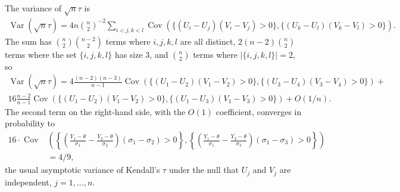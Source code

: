 \documentclass[12pt]{article}
\renewcommand{\P}{P}
\newcommand{\y}{Y}
\renewcommand{\u}{U}
\renewcommand{\v}{V}
\newcommand{\thetahat}{\hat{\theta}}
\newcommand{\h}[2]{\{(\u_{#1}-\u_{#2})(\v_{#1}-\v_{#2})>0\}}
\DeclareMathOperator{\E}{E}
\DeclareMathOperator{\V}{Var}
\DeclareMathOperator{\Cov}{Cov}
\newcommand{\comment}[1]{
  \iftoggle{commenttoggle}{
    {\normalsize{\color{red}{ #1}}\normalsize}
  }
  {}
}
\begin{document}
  The variance of $\sqrt{n}\tau$ is 
    \begin{align}
      \V(\sqrt{n}\tau)=4n{n\choose 2}^{-2}\sum_{i<j,k<l}\Cov(\h{i}{j},\h{k}{l}).
    \end{align}%
    The sum has ${n\choose 2}{n-2\choose 2}$ terms where $i,j,k,l$ are
    all distinct, $2(n-2){n\choose 2}$ terms where the set
    $\{i,j,k,l\}$ has size 3, and ${n\choose 2}$ terms where
    $|\{i,j,k,l\}|=2$, so
    \begin{align}
      \V(\sqrt{n}\tau)=4\frac{(n-2)(n-3)}{n-1}\Cov(\h{1}{2},\h{3}{4})+\\
      16\frac{n-2}{n-1}\Cov(\h{1}{2},\h{1}{3}) + O(1/n).
    \end{align}    
     The second term on the right-hand side, with the $O(1)$ coefficient, converges in probability to
    \begin{align}
    16\cdot\Cov&\left(\left\{\left(\frac{\y_1-\theta}{\sigma_1}
          -\frac{\y_2-\theta}{\sigma_2}\right)(\sigma_1-\sigma_2)>0\right\} ,
                 \left\{\left(\frac{\y_1-\theta}{\sigma_1}-\frac{\y_3-\theta}{\sigma_3}\right)(\sigma_1-\sigma_3)>0\right\}\right)\\
      &=4/9,
    \end{align}
    the usual asymptotic variance of
    Kendall's $\tau$ under the  null that $U_j$ and $V_j$ are independent, $j=1,\ldots,n.$
\end{document}
